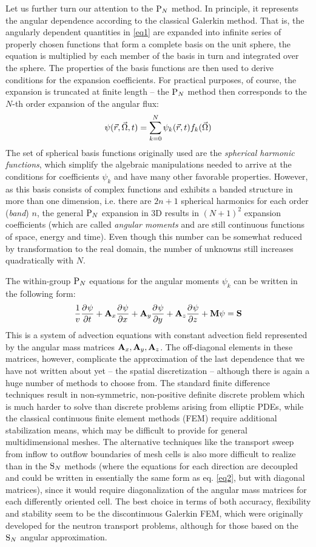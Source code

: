 Let us further turn our attention to the $\PN$ method. In principle, it represents the angular dependence according to the classical Galerkin method. That is, the angularly dependent quantities in \eqref{eq1} are expanded into infinite series of properly chosen functions that form a complete basis on the unit sphere, the equation is multiplied by each member of the basis in turn and integrated over the sphere. The properties of the basis functions are then used to derive conditions for the expansion coefficients. For practical purposes, of course, the expansion is truncated at finite length -- the $\PN$ method then corresponds to the $N$-th order expansion of the angular flux:
$$
  \psi(\br,\bomega,t) = \sum_{k=0}^N \psi_k(\br,t) f_k(\bomega)
$$
The set of spherical basis functions originally used are the \textit{spherical harmonic functions}, which simplify the algebraic manipulations needed to arrive at the conditions for coefficients $\psi_k$ and have many other favorable properties. However, as this basis consists of complex functions and exhibits a banded structure in more than one dimension, i.e. there are $2n + 1$ spherical harmonics for each order (\textit{band}) $n$, the general $\PN$ expansion in 3D results in $(N+1)^2$ expansion coefficients (which are called \textit{angular moments} and are still continuous functions of space, energy and time). Even though this number can be somewhat reduced by transformation to the real domain, the number of unknowns still increases quadratically with $N$.

The within-group $\PN$ equations for the angular moments $\psi_k$ can be written in the following form:
\begin{equation}\label{eq2}
  \frac1v \pd{\psi}{t} + \AA_x\pd{\psi}{x} + \AA_y\pd{\psi}{y} + \AA_z\pd{\psi}{z} + \MM\psi = \SS
\end{equation}
This is a system of advection equations with constant advection field represented by the angular mass matrices $\AA_x, \AA_y, \AA_z$. The off-diagonal elements in these matrices, however, complicate the approximation of the last dependence that we have not written about yet -- the spatial discretization -- although there is again a huge number of methods to choose from. The standard finite difference techniques result in non-symmetric, non-positive definite discrete problem which is much harder to solve than discrete problems arising from elliptic PDEs, while the classical continuous finite element methods (FEM) require additional stabilization means, which may be difficult to provide for general multidimensional meshes. The alternative techniques like the transport sweep from inflow to outflow boundaries of mesh cells is also more difficult to realize than in the $\SN$ methods (where the equations for each direction are decoupled and could be written in essentially the same form as eq. \eqref{eq2}, but with diagonal matrices), since it would require diagonalization of the angular mass matrices for each differently oriented cell. The best choice in terms of both accuracy, flexibility and stability seem to be the discontinuous Galerkin FEM, which were originally developed for the neutron transport problems, although for those based on the $\SN$ angular approximation. 

